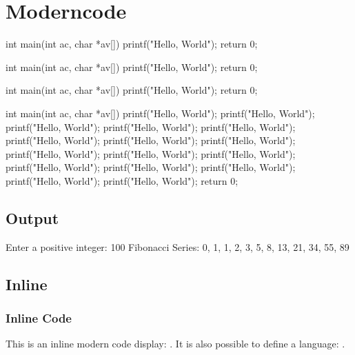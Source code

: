 \documentclass[10pt]{article}
\begin{document}
\section{Moderncode}

\begin{moderncode}[C][adjusted title={Title}]
int main(int ac, char *av[])
{
	printf("Hello, World");
	return 0;
}
\end{moderncode}

\begin{moderncode}[C][adjusted title={This title is very very very very very very very very very long}]
int main(int ac, char *av[])
{
	printf("Hello, World");
	return 0;
}
\end{moderncode}

\begin{moderncode}[C]
int main(int ac, char *av[])
{
	printf("Hello, World");
	return 0;
}
\end{moderncode}

\begin{moderncode}[C][adjusted title={This is a very long code}]
int main(int ac, char *av[])
{
	printf("Hello, World");
	printf("Hello, World");
	printf("Hello, World");
	printf("Hello, World");
	printf("Hello, World");
	printf("Hello, World");
	printf("Hello, World");
	printf("Hello, World");
	printf("Hello, World");
	printf("Hello, World");
	printf("Hello, World");
	printf("Hello, World");
	printf("Hello, World");
	printf("Hello, World");
	printf("Hello, World");
	printf("Hello, World");
	return 0;
}
\end{moderncode}

\subsection{Output}

\begin{moderncodeout}
Enter a positive integer: 100
Fibonacci Series: 0, 1, 1, 2, 3, 5, 8, 13, 21, 34, 55, 89
\end{moderncodeout}

\subsection{Inline}

\subsubsection{Inline Code}

This is an inline modern code display: \moderncodeinline{\LaTeX}. It is also possible to define a language: .
\end{document}
